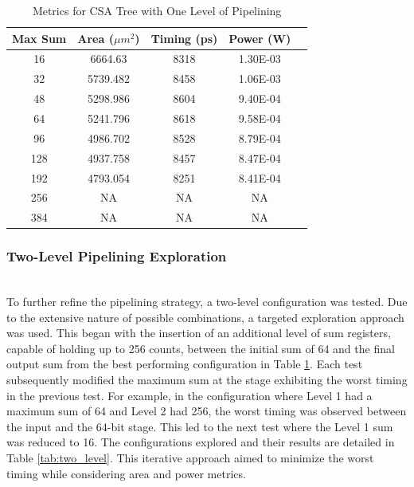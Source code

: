 \documentclass[conference]{IEEEtran}
\begin{document}
\begin{table}[h]
    \centering
    \caption{Metrics for CSA Tree with One Level of Pipelining}
    \label{tab:first_level}
    \begin{tabular}{@{}ccccc@{}}
        \toprule
        \textbf{Max Sum} & \textbf{Area ($\mu m^2$)} & \textbf{Timing (ps)} & \textbf{Power (W)} \\
        \midrule
        16 & 6664.63 & 8318 & 1.30E-03 \\
        32 & 5739.482 & 8458 & 1.06E-03 \\
        48 & 5298.986 & 8604 & 9.40E-04 \\
        64 & 5241.796 & 8618 & 9.58E-04 \\
        96 & 4986.702 & 8528 & 8.79E-04 \\
        128 & 4937.758 & 8457 & 8.47E-04 \\
        192 & 4793.054 & 8251 & 8.41E-04 \\
        256 & NA & NA & NA \\
        384 & NA & NA & NA \\
        \bottomrule
    \end{tabular}
\end{table}

\subsubsection{Two-Level Pipelining Exploration}
\hfill\\

To further refine the pipelining strategy, a two-level configuration was tested. Due to the extensive nature of possible combinations, a targeted exploration approach was used. This began with the insertion of an additional level of sum registers, capable of holding up to 256 counts, between the initial sum of 64 and the final output sum from the best performing configuration in Table \ref{tab:first_level}. Each test subsequently modified the maximum sum at the stage exhibiting the worst timing in the previous test. For example, in the configuration where Level 1 had a maximum sum of 64 and Level 2 had 256, the worst timing was observed between the input and the 64-bit stage. This led to the next test where the Level 1 sum was reduced to 16. The configurations explored and their results are detailed in Table \ref{tab:two_level}. This iterative approach aimed to minimize the worst timing while considering area and power metrics.
\end{document}
